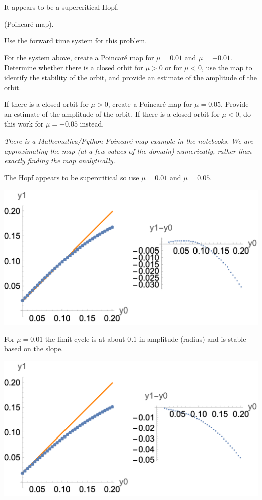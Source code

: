 \documentclass[12pt,letterpaper,answers]{exam}
\begin{document}
\begin{questions}
\begin{solution}
It appears to be a supercritical Hopf.
\end{solution}


\question (Poincar\'e map).  

Use the forward time system for this problem.
\begin{parts}
    \item For the system above, create a Poincar\'e map for $\mu = 0.01$ and $\mu = -0.01$.  Determine whether there is a closed orbit for $\mu > 0$ or for $\mu < 0$, use the map to identify the stability of the orbit, and provide an estimate of the amplitude of the orbit.
    \item If there is a closed orbit for $\mu>0$, create a Poincar\'e map for $\mu = 0.05$.  Provide an estimate of the amplitude of the orbit.  If there is a closed orbit for $\mu<0$, do this work for $\mu = -0.05$ instead.
\end{parts}

\emph{There is a Mathematica/Python Poincar\'e map example in the notebooks.  We are approximating the map (at a few values of the domain) numerically, rather than exactly finding the map analytically.}

\begin{solution}

The Hopf appears to be supercritical so use $\mu = 0.01$ and $\mu = 0.05$.

\includegraphics{img/PS08S23poincaremap1.png}

For $\mu = 0.01$ the limit cycle is at about $0.1$ in amplitude (radius) and is stable based on the slope.

\includegraphics{img/PS08S23poincaremap-1.png}


\end{solution}
\end{questions}
\end{document}
